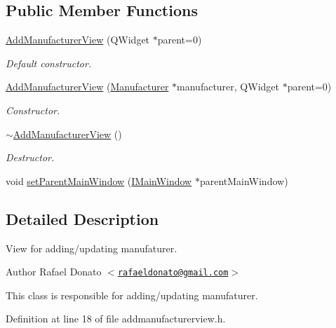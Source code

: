 \subsection*{\-Public \-Member \-Functions}
\begin{DoxyCompactItemize}
\item 
\hyperlink{class_add_manufacturer_view_a3a9f71b9670aa81052f89892525486dd}{\-Add\-Manufacturer\-View} (\-Q\-Widget $\ast$parent=0)
\begin{DoxyCompactList}\small\item\em \-Default constructor. \end{DoxyCompactList}\item 
\hyperlink{class_add_manufacturer_view_a19fd74cd7e7efdf217de6f108e239029}{\-Add\-Manufacturer\-View} (\hyperlink{class_manufacturer}{\-Manufacturer} $\ast$manufacturer, \-Q\-Widget $\ast$parent=0)
\begin{DoxyCompactList}\small\item\em \-Constructor. \end{DoxyCompactList}\item 
\hyperlink{class_add_manufacturer_view_a5f5faeaef47568cc5783a37c3cdf1f38}{$\sim$\-Add\-Manufacturer\-View} ()
\begin{DoxyCompactList}\small\item\em \-Destructor. \end{DoxyCompactList}\item 
void \hyperlink{class_add_manufacturer_view_a1b0d44699fa8464ff35b7a984ad9907d}{set\-Parent\-Main\-Window} (\hyperlink{class_i_main_window}{\-I\-Main\-Window} $\ast$parent\-Main\-Window)
\end{DoxyCompactItemize}


\subsection{\-Detailed \-Description}
\-View for adding/updating manufaturer. 

\begin{DoxyAuthor}{\-Author}
\-Rafael \-Donato $<$\href{mailto:rafaeldonato@gmail.com}{\tt rafaeldonato@gmail.\-com}$>$
\end{DoxyAuthor}
\-This class is responsible for adding/updating manufaturer. 

\-Definition at line 18 of file addmanufacturerview.\-h.



